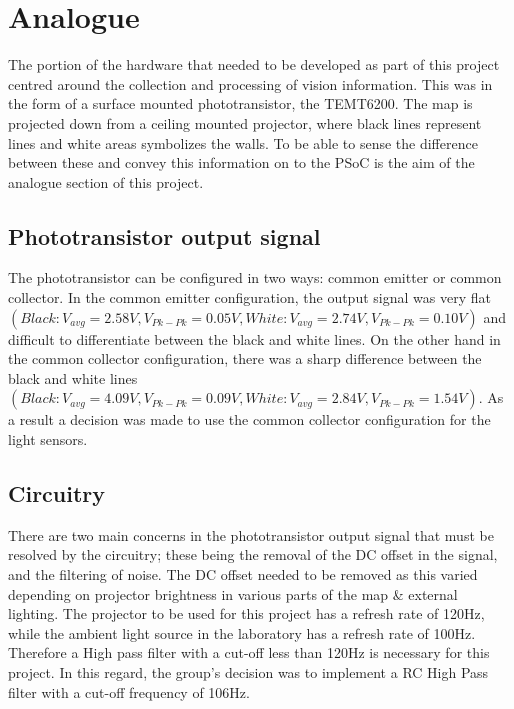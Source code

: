 \documentclass{article}
\begin{document}
\section{Analogue}

The portion of the hardware that needed to be developed as part of this project centred around the collection and processing of vision information. This was in the form of a surface mounted phototransistor, the TEMT6200. The map is projected down from a ceiling mounted projector, where black lines represent lines and white areas symbolizes the walls. To be able to sense the difference between these and convey this information on to the PSoC is the aim of the analogue section of this project.

\subsection{Phototransistor output signal}

The phototransistor can be configured in two ways: common emitter or common collector. In the common emitter configuration, the output signal was very flat $(Black: V_{avg} = 2.58V, V_{Pk-Pk} = 0.05V, White: V_{avg} = 2.74V, V_{Pk-Pk} = 0.10V)$ and difficult to differentiate between the black and white lines. On the other hand in the common collector configuration, there was a sharp difference between the black and white lines $(Black: V_{avg} = 4.09V, V_{Pk-Pk} = 0.09V, White: V_{avg} = 2.84V, V_{Pk-Pk} = 1.54V)$. As a result a decision was made to use the common collector configuration for the light sensors.

\subsection{Circuitry}

There are two main concerns in the phototransistor output signal that must be resolved by the circuitry; these being the removal of the DC offset in the signal, and the filtering of noise. The DC offset needed to be removed as this varied depending on projector brightness in various parts of the map \& external lighting. The projector to be used for this project has a refresh rate of 120Hz, while the ambient light source in the laboratory has a refresh rate of 100Hz. Therefore a High pass filter with a cut-off less than 120Hz is necessary for this project. In this regard, the group's decision was to implement a RC High Pass filter with a cut-off frequency of 106Hz.
\end{document}
